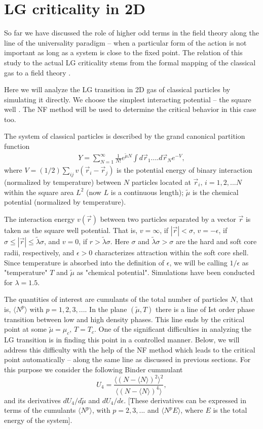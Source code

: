 \documentclass[prb,aps,twocolumn,groupedaddress,floats,showpacs,final]{revtex4}
\def\beq{\begin{eqnarray}}
\def\eeq{\end{eqnarray}}
\begin{document}
\section{LG criticality in 2D}\label{LG}
So far we have discussed the role of higher odd terms in the field theory along the line of the universality paradigm -- when a particular form of the action is not important as long as a system is close to the fixed point. The relation of this study to the actual LG criticality stems from the formal mapping of the classical gas to a field theory \cite{Hubbard}. 

Here we will analyze the LG transition in 2D gas of classical particles by simulating it directly. We choose the simplest  interacting potential -- the square well \cite{SW}. The NF method will be used to determine the critical behavior in this case too. 

The system of classical particles is described by the grand canonical  partition function
\beq
Y = \sum_{N=1}^\infty \frac{1}{N!}  e^{\tilde{\mu} N}\int d\vec{r}_1 ....d\vec{r}_N e^{- V},
\label{Y}
\eeq
where $V= (1/2)\sum_{ij} v(\vec{r}_i -\vec{r}_j)$ is the potential energy of binary interaction (normalized by temperature) between $N$ particles located at $\vec{r}_i, \, i=1,2,...N$ within the square area $L^2$ (now $L$ is a continuous length); $\tilde{\mu}$ is the chemical potential (normalized by temperature).

The interaction energy  $v(\vec{r})$ between two particles separated by a vector $\vec{r}$ is taken as the square well potential.
That is, $     v =   \infty$,  if $|\vec{r}|<\sigma$,  $ v= -\epsilon $, if $ \sigma \leq |\vec{r}|  \leq \tilde{\lambda}\sigma $, and $ v=0$, if $ r > \tilde{\lambda}\sigma$.
   Here $\sigma$ and $\tilde{\lambda}\sigma > \sigma$ are the hard and soft core radii, respectively, and $\epsilon >0$ characterizes attraction within the soft core shell. Since temperature is absorbed into the definition of $\epsilon$, we will be calling $1/\epsilon$ as "temperature" $T$ and $\tilde{\mu}$ as "chemical potential". Simulations have been conducted for $\lambda=1.5$. 

The quantities of interest are cumulants of the total number of particles $N$, that is, $\langle N^p \rangle$ with $p=1,2,3, ...$.
In the plane $(\tilde{\mu}, T)$ there is a line of Ist order phase transition between low and high density phases. This line ends by the critical point at some $\tilde{\mu}=\mu_c,\, T=T_c$. One of the significant difficulties in analyzing the LG transition is in finding this point in a controlled manner.   
Below, we will address this difficulty with the help of the NF method which leads to the critical point automatically -- along the same line as discussed in previous sections.  For this purpose we consider
the following Binder cummulant
\begin{equation}
	U_{4} = \frac{\langle (N-\langle N \rangle )^2 \rangle^2}{\langle (N-\langle N \rangle )^4 \rangle},
\label{U4}
\end{equation}
and its derivatives $dU_4/d\tilde{\mu}$ and $dU_4/d\epsilon$. [These derivatives can be expressed in terms of the cumulants $\langle N^p\rangle$, with $p=2,3, ...$  and $\langle N^p E\rangle$, where $E$ is the total energy of the system].
\end{document}
